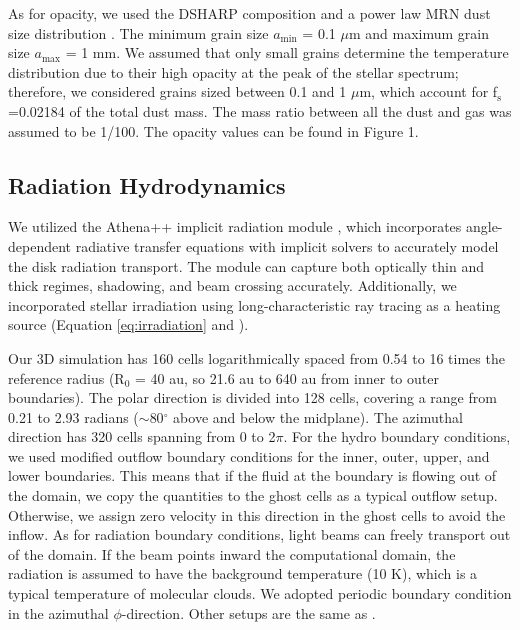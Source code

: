 \documentclass[twocolumn,tighten]{aastex631}
\begin{document}
As for opacity, we used the DSHARP composition \citep{birnstiel18} and a power law MRN dust size distribution \citep[$n(a) \propto a^{-3.5}$,][]{mathis77}. The minimum grain size $a_\mathrm{min}$ = 0.1 $\mu$m and maximum grain size $a_\mathrm{max}$ = 1 mm. We assumed that only small grains determine the temperature distribution due to their high opacity at the peak of the stellar spectrum; therefore, we considered grains sized between 0.1 and 1 $\mu$m, which account for f$_\mathrm{s}$=0.02184 of the total dust mass. The mass ratio between all the dust and gas was assumed to be 1/100. The opacity values can be found in \citet{zhang24} Figure 1.

\subsection{Radiation Hydrodynamics}
We utilized the Athena++ \citep{stone20} implicit radiation module \citep{jiang14, jiang21}, which incorporates angle-dependent radiative transfer equations with implicit solvers to accurately model the disk radiation transport. The module can capture both optically thin and thick regimes, shadowing, and beam crossing accurately. Additionally, we incorporated stellar irradiation using long-characteristic ray tracing as a heating source (Equation \ref{eq:irradiation} and \citealt{zhang24}).

Our 3D simulation has 160 cells logarithmically spaced from 0.54 to 16 times the reference radius (R$_0$ = 40 au, so 21.6 au to 640 au from inner to outer boundaries). The polar direction is divided into 128 cells, covering a range from 0.21 to 2.93 radians ($\sim$80$^\circ$ above and below the midplane). The azimuthal direction has 320 cells spanning from 0 to 2$\pi$. For the hydro boundary conditions, we used modified outflow boundary conditions for the inner, outer, upper, and lower boundaries. This means that if the fluid at the boundary is flowing out of the domain, we copy the quantities to the ghost cells as a typical outflow setup. Otherwise, we assign zero velocity in this direction in the ghost cells to avoid the inflow. As for radiation boundary conditions, light beams can freely transport out of the domain. If the beam points inward the computational domain, the radiation is assumed to have the background temperature (10 K), which is a typical temperature of molecular clouds. We adopted periodic boundary condition in the azimuthal $\phi$-direction. Other setups are the same as \citet{zhang24}.
\end{document}
